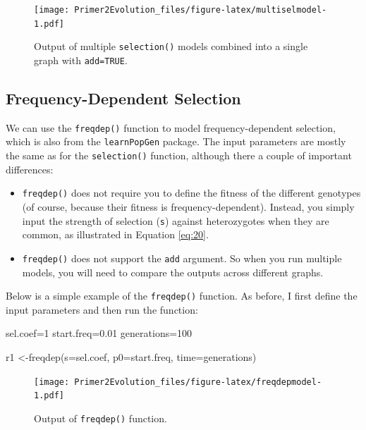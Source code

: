 \documentclass[
]{book}
\newenvironment{Shaded}{\begin{snugshade}}{\end{snugshade}}
\newcommand{\AttributeTok}[1]{\textcolor[rgb]{0.77,0.63,0.00}{#1}}
\newcommand{\DecValTok}[1]{\textcolor[rgb]{0.00,0.00,0.81}{#1}}
\newcommand{\FloatTok}[1]{\textcolor[rgb]{0.00,0.00,0.81}{#1}}
\newcommand{\FunctionTok}[1]{\textcolor[rgb]{0.00,0.00,0.00}{#1}}
\newcommand{\NormalTok}[1]{#1}
\newcommand{\OtherTok}[1]{\textcolor[rgb]{0.56,0.35,0.01}{#1}}
\begin{document}
\begin{figure}
\centering
\texttt{[image: Primer2Evolution\_files/figure-latex/multiselmodel-1.pdf]}
\caption{\label{fig:multiselmodel}Output of multiple \texttt{selection()} models combined into a single graph with \texttt{add=TRUE}.}
\end{figure}

\hypertarget{frequency-dependent-selection-1}{%
\subsection{Frequency-Dependent Selection}\label{frequency-dependent-selection-1}}

We can use the \texttt{freqdep()} function to model frequency-dependent selection, which is also from the \texttt{learnPopGen} package. The input parameters are mostly the same as for the \texttt{selection()} function, although there a couple of important differences:

\begin{itemize}
\item
  \texttt{freqdep()} does not require you to define the fitness of the different genotypes (of course, because their fitness is frequency-dependent). Instead, you simply input the strength of selection (\texttt{s}) against heterozygotes when they are common, as illustrated in Equation \eqref{eq:20}.
\item
  \texttt{freqdep()} does not support the \texttt{add} argument. So when you run multiple models, you will need to compare the outputs across different graphs.
\end{itemize}

Below is a simple example of the \texttt{freqdep()} function. As before, I first define the input parameters and then run the function:

\begin{Shaded}
\begin{Highlighting}[]
\NormalTok{sel.coef}\OtherTok{=}\DecValTok{1}
\NormalTok{start.freq}\OtherTok{=}\FloatTok{0.01}
\NormalTok{generations}\OtherTok{=}\DecValTok{100}

\NormalTok{r1 }\OtherTok{\textless{}{-}}\FunctionTok{freqdep}\NormalTok{(}\AttributeTok{s=}\NormalTok{sel.coef, }\AttributeTok{p0=}\NormalTok{start.freq, }\AttributeTok{time=}\NormalTok{generations)}
\end{Highlighting}
\end{Shaded}

\begin{figure}
\centering
\texttt{[image: Primer2Evolution\_files/figure-latex/freqdepmodel-1.pdf]}
\caption{\label{fig:freqdepmodel}Output of \texttt{freqdep()} function.}
\end{figure}
\end{document}
